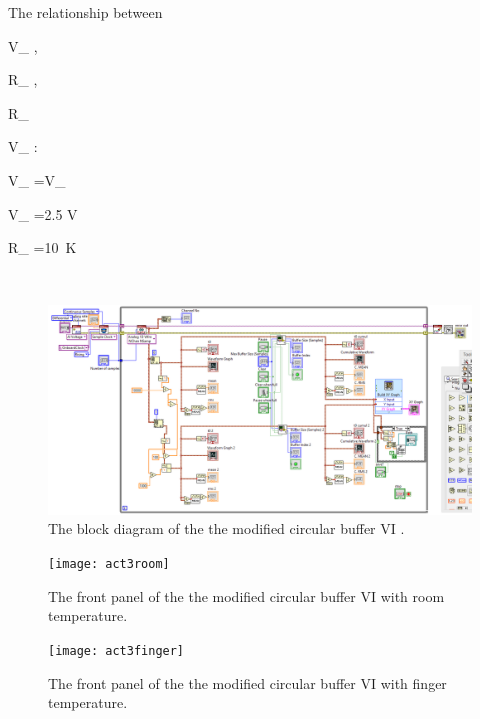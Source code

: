 \documentclass[11pt]{article}
\begin{document}
The relationship between {\displaystyle V_{ }, {\displaystyle R_{ }, {\displaystyle R_{\ } {\ }   {\displaystyle V_{ } :


{\displaystyle V_{ }={}\cdot V_{ }} 


{V_{ }=2.5 V}

{R_{ }=10\ K\Omega}


\

\begin{figure}[H]
 \begin{center}
  \includegraphics[width=\linewidth/2]{act3bp}
  \caption{The block diagram of the the modified circular buffer VI .}
  \label{fig:act3bp}
 \end{center}
\end{figure}

\begin{figure}[H]
 \begin{center}
  \texttt{[image: act3room]}
  \caption{The front panel of the the modified circular buffer VI with room temperature.}
  \label{fig:act3room}
 \end{center}
\end{figure}

\begin{figure}[H]
 \begin{center}
  \texttt{[image: act3finger]}
  \caption{The front panel of the the modified circular buffer VI with finger temperature.}
  \label{fig:act3finger}
 \end{center}
\end{figure}

}}}}
\end{document}
